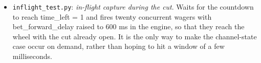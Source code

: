 \documentclass[12pt,a4paper]{article}
\begin{document}
\begin{itemize}
\begin{itemize}
        \item \texttt{inflight\_\allowbreak test.py}: \textit{in-flight capture during the cut}. Waits for the countdown to reach time\_\allowbreak left = 1 and fires twenty concurrent wagers with bet\_\allowbreak forward\_\allowbreak delay raised to 600 ms in the engine, so that they reach the wheel with the cut already open. It is the only way to make the channel-state case occur on demand, rather than hoping to hit a window of a few milliseconds.
    \end{itemize}
\end{itemize}
\end{document}
